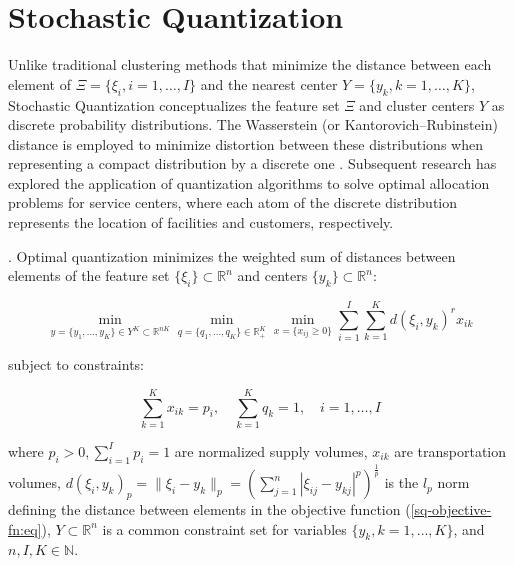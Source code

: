 \section{Stochastic Quantization}

Unlike traditional clustering methods that minimize the distance between each element of $\Xi = \{\xi_i, i = 1, \ldots, I\}$ and the nearest center $Y = \{y_k, k = 1, \ldots, K\}$, Stochastic Quantization conceptualizes the feature set $\Xi$ and cluster centers $Y$ as discrete probability distributions. The Wasserstein (or Kantorovich–Rubinstein) distance is employed to minimize distortion between these distributions when representing a compact distribution by a discrete one \cite{Kuzmenko_Uryasev_2019,Lakshmanan_Pichler_2023}. Subsequent research \cite{Kuzmenko_Uryasev_2019,Norkin_Onishchenko_2005} has explored the application of quantization algorithms to solve optimal allocation problems for service centers, where each atom of the discrete distribution represents the location of facilities and customers, respectively.

\begin{definition}
    \label{Stochastic Quantization} \cite{Kuzmenko_Uryasev_2019}. Optimal quantization minimizes the weighted sum of distances between elements of the feature set $\{\xi_i\} \subset \mathbb{R}^{n}$ and centers $\{y_k\} \subset \mathbb{R}^{n}$:

    \begin{equation}
        \label{sq-objective-fn:eq}
            \min_{y = \{ y_1, \ldots, y_K \} \in Y^K \subset \mathbb{R}^{nK}} \min_{q = \{ q_1, \ldots, q_K \} \in \mathbb{R}^K_{+}} \min_{x = \{ x_{ij} \geq 0 \}} \sum_{i=1}^I \sum_{k=1}^K d(\xi_i, y_k)^r x_{ik}
    \end{equation}

    subject to constraints:

    \begin{equation}
        \label{sq-objective-constraints:eq}
            \sum_{k=1}^K x_{ik} = p_i, \quad \sum_{k=1}^K q_k = 1, \quad i = 1, \ldots, I
    \end{equation}

    \noindent where $p_i > 0, \sum_{i=1}^I p_i = 1$ are normalized supply volumes, $x_{ik}$ are transportation volumes, $ d(\xi_i, y_k)_p = \| \xi_i - y_k \|_p = (\sum_{j=1}^n | \xi_{ij} - y_{kj} |^p)^{\frac{1}{p}} $ is the $l_p$ norm defining the distance between elements in the objective function (\ref{sq-objective-fn:eq}), $Y \subset \mathbb{R}^{n}$ is a common constraint set for variables $\{y_k, k = 1, \ldots, K\}$, and $n, I, K \in \mathbb{N}$.
\end{definition}

